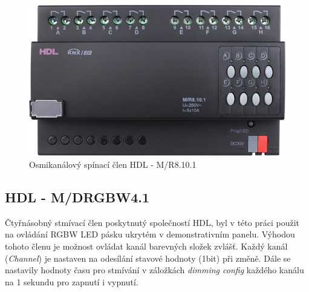 \begin{figure}[!ht]
  \begin{center}
    \includegraphics[scale=0.35]{obrazky/HLD aktor1.jpg}
  \end{center}
  \caption[Osmikanálový spínací člen HDL - M/R8.10.1 \cite{HDL aktor1}]{Osmikanálový spínací člen HDL - M/R8.10.1  \cite{HDL aktor1}}
  \label{fig:Osmikanálový spínací člen HDL - M/R8.10.1}
\end{figure}

\subsection{HDL - M/DRGBW4.1}
Čtyřnásobný stmívací člen poskytnutý společností HDL, byl v této práci použit na ovládání RGBW LED pásku ukrytém v demonstrativním panelu. Výhodou tohoto členu je možnost ovládat kanál barevných složek zvlášť. Každý kanál (\textit{Channel}) je nastaven na odesílání stavové hodnoty (1bit) při změně. Dále se nastavily hodnoty času pro stmívání v záložkách \textit{dimming config} každého kanálu na 1 sekundu pro zapnutí i vypnutí. 

